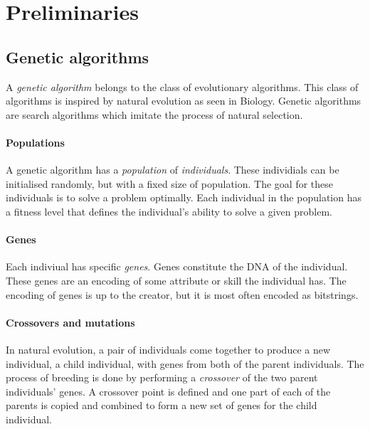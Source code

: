 \section{Preliminaries}
\label{sec:preliminaries}


\subsection{Genetic algorithms}

A \emph{genetic algorithm} belongs to the class of evolutionary algorithms.
This class of algorithms is inspired by natural evolution as seen in Biology.
Genetic algorithms are search algorithms which imitate the process of natural selection.

\paragraph{Populations}

A genetic algorithm has a \emph{population} of \emph{individuals}.
These individials can be initialised randomly, but with a fixed size of population.
The goal for these individuals is to solve a problem optimally.
Each individual in the population has a fitness level that defines the individual's ability to solve a given problem.

\paragraph{Genes}

Each indiviual has specific \emph{genes}.
Genes constitute the DNA of the individual.
These genes are an encoding of some attribute or skill the individual has.
The encoding of genes is up to the creator, but it is most often encoded as bitstrings.

\paragraph{Crossovers and mutations}

In natural evolution, a pair of individuals come together to produce a new individual, a child individual, with genes from both of the parent individuals.
The process of breeding is done by performing a \emph{crossover} of the two parent individuals' genes.
A crossover point is defined and one part of each of the parents is copied and combined to form a new set of genes for the child individual.

